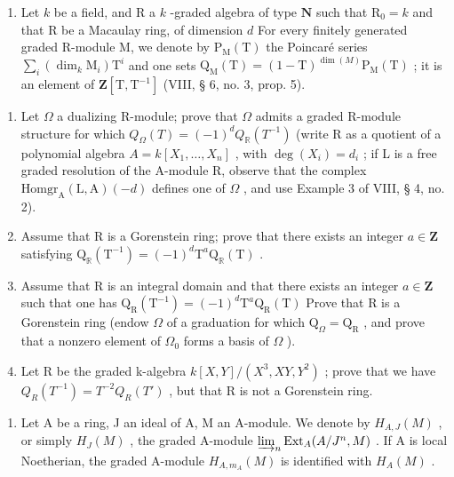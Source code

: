 \begin{enumerate}
\def\labelenumi{\arabic{enumi})}
\setcounter{enumi}{11}
\tightlist
\item
  Let \(k\) be a field, and R a \(k\) -graded algebra of type \(\mathbf{N}\) such that \(\mathrm{R}_0 = k\) and that R be a Macaulay ring, of dimension \(d\) For every finitely generated graded R-module M, we denote by \(\mathrm{P}_{\mathrm{M}}(\mathrm{T})\) the Poincaré series \(\sum_{i} (\dim_k \mathrm{M}_i) \mathrm{T}^i\) and one sets \(\mathrm{Q}_{\mathrm{M}}(\mathrm{T}) = (1 - \mathrm{T})^{\dim(M)} \mathrm{P}_{\mathrm{M}}(\mathrm{T})\) ; it is an element of \(\mathbf{Z}[\mathrm{T}, \mathrm{T}^{-1}]\) (VIII, § 6, no. 3, prop. 5).
\end{enumerate}

\begin{enumerate}
\def\labelenumi{\alph{enumi})}
\item
  Let \(\Omega\) a dualizing R-module; prove that \(\Omega\) admits a graded R-module structure for which \(Q_{\Omega}(T) = (-1)^{d} Q_{\mathbb{R}}(T^{-1})\) (write R as a quotient of a polynomial algebra \(A = k[X_1, \ldots, X_n]\) , with \(\deg(X_i) = d_i\) ; if L is a free graded resolution of the A-module R, observe that the complex \(\mathrm{Homgr}_{\mathrm{A}}(\mathrm{L}, \mathrm{A})(-d)\) defines one of \(\Omega\) , and use Example 3 of VIII, § 4, no. 2).
\item
  Assume that R is a Gorenstein ring; prove that there exists an integer \(a \in \mathbf{Z}\) satisfying \(\mathrm{Q}_{\mathbb{R}}(\mathrm{T}^{-1}) = (-1)^{d}\mathrm{T}^{a}\mathrm{Q}_{\mathbb{R}}(\mathrm{T})\) .
\item
  Assume that R is an integral domain and that there exists an integer \(a \in \mathbf{Z}\) such that one has \(\mathrm{Q}_{\mathrm{R}}(\mathrm{T}^{-1}) = (-1)^{d}\mathrm{T}^{a}\mathrm{Q}_{\mathrm{R}}(\mathrm{T})\) Prove that R is a Gorenstein ring (endow \(\Omega\) of a graduation for which \(\mathrm{Q}_{\Omega} = \mathrm{Q}_{\mathrm{R}}\) , and prove that a nonzero element of \(\Omega_{0}\) forms a basis of \(\Omega\) ).
\item
  Let R be the graded k-algebra \(k[X,Y]/(X^{3},XY,Y^{2})\) ; prove that we have \(Q_{R}(T^{-1}) = T^{-2}Q_{R}(T')\) , but that R is not a Gorenstein ring.
\end{enumerate}


\begin{enumerate}
\def\labelenumi{\arabic{enumi})}
\tightlist
\item
  Let A be a ring, J an ideal of A, M an A-module. We denote by \(H_{A,J}(M)\) , or simply \(H_{J}(M)\) , the graded A-module \(\varinjlim_{n}\operatorname{Ext}_{A}(A/J^{n},M)\) . If A is local Noetherian, the graded A-module \(H_{A,m_{A}}(M)\) is identified with \(H_{A}(M)\) .
\end{enumerate}

